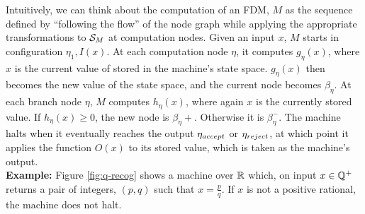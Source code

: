 
\vspace{\baselineskip}

Intuitively, we can think about the computation of an FDM, $M$ as the
sequence defined by ``following the flow'' of the node graph while
applying the appropriate transformations to $\mathcal{S}_M$ at
computation nodes. Given an input $x$, $M$ starts in configuration
$\eta_1, I(x)$. At each computation node $\eta$, it computes
$g_\eta(x)$, where $x$ is the current value of stored in the machine's
state space.  $g_\eta(x)$ then becomes the new value of the state
space, and the current node becomes $\beta_{\eta}$.  At each branch
node $\eta$, $M$ computes $h_\eta(x)$, where again $x$ is the
currently stored value.  If $h_\eta(x) \geq 0$, the new node is
$\beta_\eta+$.  Otherwise it is $\beta_\eta^-$.  The machine halts
when it eventually reaches the output $\eta_{accept}$ or $\eta_{reject}$, at which
point it applies the function $O(x)$ to its stored value, which is
taken as the machine's output.\\

\textbf{Example: } Figure \ref{fig:q-recog} shows a machine over
$\mathbb{R}$ which, on input $x \in \mathbb{Q}^+ $ returns a pair of
integers, $(p,q)$ such that $x = \frac{p}{q}$.  If $x$ is not a
positive rational, the machine does not halt.

